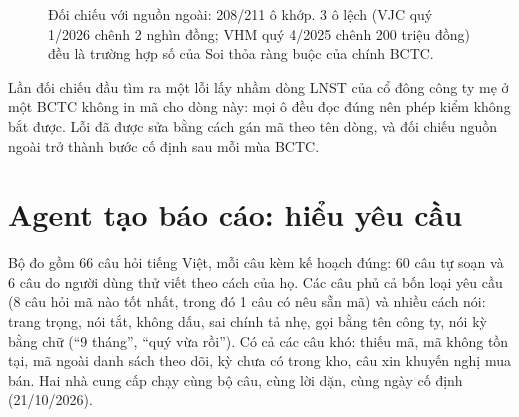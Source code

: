 \documentclass[12pt,a4paper]{report}
\newcommand{\enquote}[1]{“#1”}
\begin{document}
\begin{figure}[H]
\centering
{}
\caption{Đối chiếu với nguồn ngoài: 208/211 ô khớp. 3 ô lệch (VJC quý 1/2026 chênh 2 nghìn đồng; VHM quý 4/2025 chênh
200 triệu đồng) đều là trường hợp số của Soi thỏa ràng buộc của chính BCTC.}\label{fig:doichieu}
\end{figure}

Lần đối chiếu đầu tìm ra một lỗi lấy nhầm dòng LNST của cổ đông công ty mẹ ở một BCTC không in mã cho dòng này: mọi ô
đều đọc đúng nên phép kiểm không bắt được. Lỗi đã được sửa bằng cách gán mã theo tên dòng, và đối chiếu nguồn ngoài trở
thành bước cố định sau mỗi mùa BCTC.

\section{Agent tạo báo cáo: hiểu yêu cầu}\label{sec:evalagent}
Bộ đo gồm 66 câu hỏi tiếng Việt, mỗi câu kèm kế hoạch đúng: 60 câu tự soạn và 6 câu do người dùng thử viết theo cách
của họ. Các câu phủ cả bốn loại yêu cầu (8 câu hỏi mã nào tốt nhất, trong đó 1 câu có nêu sẵn mã) và nhiều cách nói:
trang trọng,
nói tắt, không dấu, sai chính tả nhẹ, gọi bằng tên công ty, nói kỳ bằng chữ (\enquote{9 tháng}, \enquote{quý vừa
rồi}). Có cả các câu khó: thiếu mã, mã không tồn tại, mã ngoài danh sách theo dõi, kỳ chưa có trong kho, câu xin khuyến
nghị mua bán. Hai nhà cung cấp chạy cùng bộ câu, cùng lời dặn, cùng ngày cố định (21/10/2026).
\end{document}
